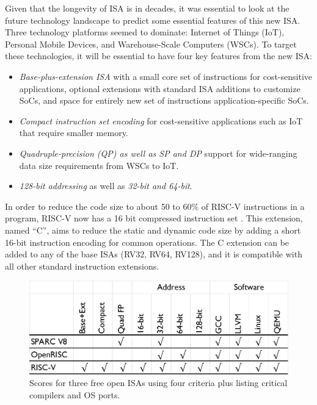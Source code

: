 \documentclass[journal]{IEEEtran}
\begin{document}
Given that the longevity of ISA is in decades, it was essential to look at the future technology landscape to predict some essential features of this new ISA. Three technology platforms seemed to dominate: Internet of Things (IoT), Personal Mobile Devices, and Warehouse-Scale Computers (WSCs). To target these technologies, it will be essential to have four key features from the new ISA:
\begin{itemize}
    \item \textit{Base-plus-extension ISA} with a small core set of instructions for cost-sensitive applications, optional extensions with standard ISA additions to customize SoCs, and space for entirely new set of instructions application-specific SoCs.
    \item \textit{Compact instruction set encoding} for cost-sensitive applications such as IoT that require smaller memory.
    \item \textit{Quadruple-precision (QP) as well as SP and DP} support for wide-ranging data size requirements from WSCs to IoT.
    \item \textit{128-bit addressing} as well as \textit{32-bit and 64-bit}.
\end{itemize}

In order to reduce the code size to about 50 to 60\% of RISC-V instructions in a program, RISC-V now has a 16 bit compressed instruction set \cite{waterman_risc-v_2015}. This extension, named “C”, aims to reduce the static and dynamic code size by adding a short 16-bit instruction encoding for common operations. The C extension can be added to any of the base ISAs (RV32, RV64, RV128), and it is compatible with all other standard instruction extensions.

\begin{figure}[htb]
    \centering
    \includegraphics[width=0.95\linewidth]{image-3FreeISA-Table.jpg}
    \caption{Scores for three free open ISAs using four criteria plus listing critical compilers and OS ports.}
    \label{fig:score}
\end{figure}
\end{document}
